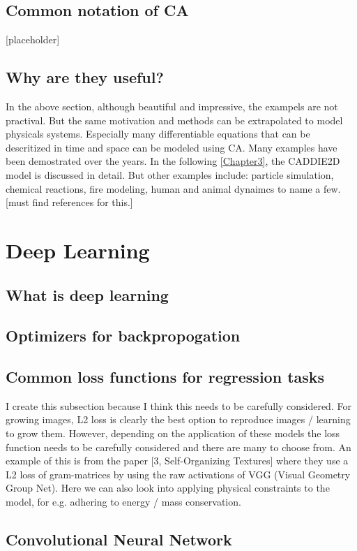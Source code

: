 \subsection{Common notation of CA}
[placeholder]
\subsection{Why are they useful?}
In the above section, although beautiful and impressive, the exampels are not practival. But the same motivation and methods can be extrapolated to model physicals systems. Especially many differentiable equations that can be descritized in time and space can be modeled using CA. Many examples have been demostrated over the years. In the following \ref{Chapter3}, the CADDIE2D model is discussed in detail. But other examples include: particle simulation, chemical reactions, fire modeling, human and animal dynaimcs to name a few. [must find references for this.]

\section{Deep Learning}
\subsection{What is deep learning}
\subsection{Optimizers for backpropogation}
\subsection{Common loss functions for regression tasks}
I create this subsection because I think this needs to be carefully considered. For growing images, L2
loss is clearly the best option to reproduce images / learning to grow them. However, depending on
the application of these models the loss function needs to be carefully considered and there are many
to choose from. An example of this is from the paper [3, Self-Organizing Textures] where they use a
L2 loss of gram-matrices by using the raw activations of VGG (Visual Geometry Group Net).
Here we can also look into applying physical constraints to the model, for e.g. adhering to energy
/ mass conservation.
\subsection{Convolutional Neural Network}

